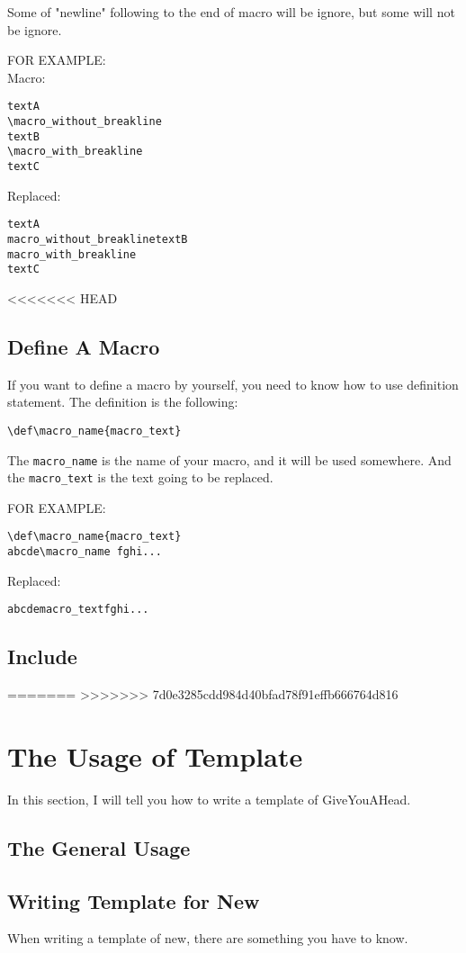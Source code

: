 \documentclass[UTF8]{article} %
\begin{document}
Some of "newline" following to the end of macro will be ignore, but some will not be ignore.

FOR EXAMPLE:\\
Macro:
\begin{lstlisting}
textA
\macro_without_breakline
textB
\macro_with_breakline
textC
\end{lstlisting}
Replaced:
\begin{lstlisting}
textA
macro_without_breaklinetextB
macro_with_breakline
textC
\end{lstlisting}
<<<<<<< HEAD

\subsection{Define A Macro}
If you want to define a macro by yourself, you need to know how to use definition statement.
The definition is the following:
\begin{lstlisting}
\def\macro_name{macro_text}
\end{lstlisting}

The \verb"macro_name" is the name of your macro, and it will be used somewhere. And the \verb"macro_text" is the text going to be replaced.

FOR EXAMPLE:
\begin{lstlisting}
\def\macro_name{macro_text}
abcde\macro_name fghi...
\end{lstlisting}
Replaced:
\begin{lstlisting}
abcdemacro_textfghi...
\end{lstlisting}
\subsection{Include}


=======
>>>>>>> 7d0e3285cdd984d40bfad78f91effb666764d816
\newpage
 
\section{The Usage of Template}


In this section, I will tell you how to write a template of GiveYouAHead.
\subsection{The General Usage}
\subsection{Writing Template for New}
When writing a template of new, there are something you have to know.
\end{document}
